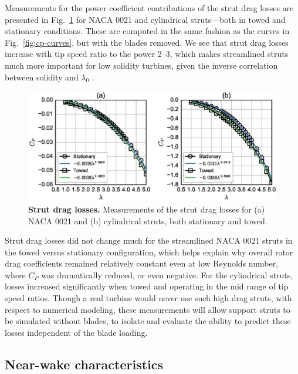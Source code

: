 \documentclass[10pt,letterpaper]{article}
\begin{document}
Measurements for the power coefficient contributions of the strut drag losses
are presented in Fig.~\ref{fig:no-blades} for NACA 0021 and cylindrical
struts---both in towed and stationary conditions. These are computed in the same
fashion as the curves in Fig.~\ref{fig:cp-curves}, but with the blades removed.
We see that strut drag losses increase with tip speed ratio to the power 2--3,
which makes streamlined struts much more important for low solidity turbines,
given the inverse correlation between solidity and $\lambda_0$
\cite{Templin1974}.

\begin{figure}[ht!]
    \includegraphics[width=\textwidth]{figures/no_blades_all.eps}
    
    \caption{{\bf Strut drag losses.} Measurements of the strut drag losses for
        (a) NACA 0021 and (b) cylindrical struts, both stationary and towed.}
    
    \label{fig:no-blades}
\end{figure}

Strut drag losses did not change much for the streamlined NACA 0021 struts in
the towed versus stationary configuration, which helps explain why overall rotor
drag coefficients remained relatively constant even at low Reynolds number,
where $C_P$ was dramatically reduced, or even negative. For the cylindrical
struts, losses increased significantly when towed and operating in the mid range
of tip speed ratios. Though a real turbine would never use such high drag
struts, with respect to numerical modeling, these measurements will allow
support struts to be simulated without blades, to isolate and evaluate the
ability to predict these losses independent of the blade loading.


\subsection*{Near-wake characteristics}
\end{document}
